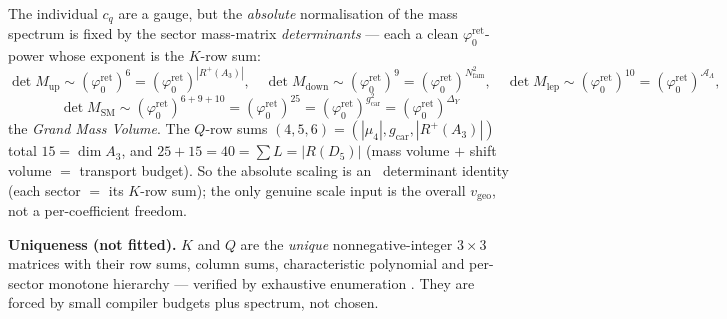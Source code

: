 \documentclass[11pt,a4paper]{article}
\newcommand{\gcar}{g_{\mathrm{car}}}
\newcommand{\Nfam}{N_{\mathrm{fam}}}
\newcommand{\phiz}{\varphi_0^{\mathrm{ret}}}
\newcommand{\AL}{\mathcal A_\Lambda}
\theoremstyle{definition}
\begin{document}
\begin{winbox}
The individual $c_q$ are a gauge, but the \emph{absolute} normalisation of the mass spectrum is fixed by the
sector mass-matrix \emph{determinants} --- each a clean $\phiz$-power whose exponent is the $K$-row sum:
\[
  \det\!M_{\mathrm{up}}\!\sim\!(\phiz)^{6}\!=\!(\phiz)^{|R^+(A_3)|},\quad
  \det\!M_{\mathrm{down}}\!\sim\!(\phiz)^{9}\!=\!(\phiz)^{\Nfam^2},\quad
  \det\!M_{\mathrm{lep}}\!\sim\!(\phiz)^{10}\!=\!(\phiz)^{\AL},
\]
\[
  \boxed{\ \det M_{\mathrm{SM}}\sim(\phiz)^{6+9+10}=(\phiz)^{25}=(\phiz)^{\gcar^2}=(\phiz)^{\Delta_Y}\ }
\]
the \emph{Grand Mass Volume}. The $Q$-row sums $(4,5,6)=(|\mu_4|,\gcar,|R^+(A_3)|)$ total $15=\dim A_3$, and
$25+15=40=\sum L=|R(D_5)|$ (mass volume $+$ shift volume $=$ transport budget). So the absolute scaling is an
\mE\ determinant identity (each sector $=$ its $K$-row sum); the only genuine scale input is the overall
$v_{\mathrm{geo}}$, not a per-coefficient freedom. 
\end{winbox}

\noindent\textbf{Uniqueness (not fitted).} $K$ and $Q$ are the \emph{unique} nonnegative-integer $3\times3$
matrices with their row sums, column sums, characteristic polynomial and per-sector monotone hierarchy ---
verified by exhaustive enumeration . They are forced by small compiler budgets plus
spectrum, not chosen.
\end{document}
